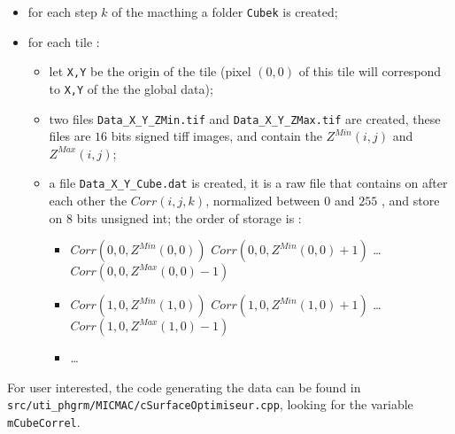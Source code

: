 \begin{itemize}
    \item  for each step $k$ of the macthing a folder {\tt Cubek} is created;
    \item  for each tile  :
    \begin{itemize}
          \item   let {\tt X,Y}  be the origin of the tile (pixel $(0,0)$ of this tile will correspond to {\tt X,Y} of the  the global data);
          \item   two files  {\tt Data\_X\_Y\_ZMin.tif} and {\tt Data\_X\_Y\_ZMax.tif}
                  are created, these files are $16$ bits signed tiff images, and contain the $Z^{Min}(i,j)$ and $Z^{Max}(i,j)$;
          \item    a file   {\tt  Data\_X\_Y\_Cube.dat} is created, it is a raw file that contains on after each other
                   the $Corr(i,j,k)$, normalized between $0$ and $255$ , and store on $8$ bits unsigned int;
                    the order of storage is  :
                   \begin{itemize}
                         \item     $Corr(0,0,Z^{Min}(0,0))$   $Corr(0,0,Z^{Min}(0,0)+1)$  \dots $Corr(0,0,Z^{Max}(0,0)-1)$
                         \item     $Corr(1,0,Z^{Min}(1,0))$   $Corr(1,0,Z^{Min}(1,0)+1)$  \dots $Corr(1,0,Z^{Max}(1,0)-1)$
                         \item     \dots
                   \end{itemize}
    \end{itemize}
\end{itemize}




For user interested, the code generating the data  can be found in 
{\tt src/uti\_phgrm/MICMAC/cSurfaceOptimiseur.cpp},
looking for the variable {\tt mCubeCorrel}.










